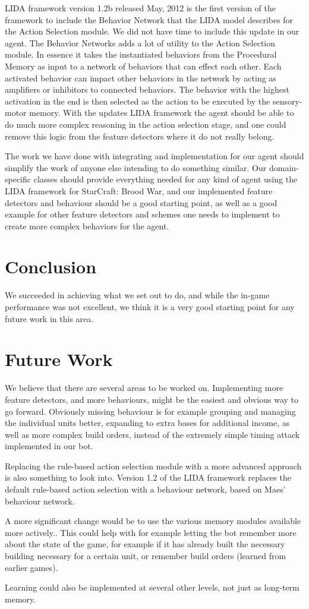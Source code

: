 LIDA framework version 1.2b released May, 2012 is the first version of the framework to include the Behavior Network that the LIDA model describes for the Action Selection module. We did not have time to include this update in our agent. The Behavior Networks adds a lot of utility to the Action Selection module. In essence it takes the instantiated behaviors from the Procedural Memory as input to a network of behaviors that can effect each other. Each activated behavior can impact other behaviors in the network by acting as amplifiers or inhibitors to connected behaviors. The behavior with the highest activation in the end is then selected as the action to be executed by the sensory-motor memory. With the updates LIDA framework the agent should be able to do much more complex reasoning in the action selection stage, and one could remove this logic from the feature detectors where it do not really belong.

The work we have done with integrating and  implementation for our agent should simplify the work of anyone else intending to do something similar. Our domain-specific classes should provide everything needed for any kind of agent using the LIDA framework for StarCraft: Brood War, and our implemented feature detectors and behaviour should be a good starting point, as well as a good example for other feature detectors and schemes one needs to implement to create more complex behaviors for the agent.


\section{Conclusion}
\label{sec:conclusion}
We succeeded in achieving what we set out to do, and while the in-game performance was not excellent, we think it is a very good starting point for any future work in this area.

\section{Future Work}
\label{sec:futurework}
We believe that there are several areas to be worked on. Implementing more feature detectors, and more behaviours, might be the easiest and obvious way to go forward. Obviously missing behaviour is for example grouping and managing the individual units better, expanding to extra bases for additional income, as well as more complex build orders, instead of the extremely simple timing attack implemented in our bot.

Replacing the rule-based action selection module with a more advanced approach is also something to look into. Version 1.2 of the LIDA framework replaces the default rule-based action selection with a behaviour network, based on Maes' behaviour network.\cite{maes1989right}

A more significant change would be to use the various memory modules available more actively.\cite{franklin2007lida}. This could help with for example letting the bot remember more about the state of the game, for example if it has already built the necessary building necessary for a certain unit, or remember build orders (learned from earlier games).

Learning could also be implemented at several other levels, not just as long-term memory.
